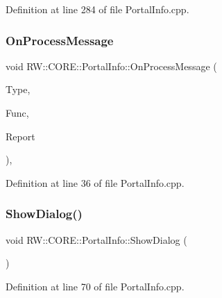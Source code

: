Definition at line 284 of file Portal\+Info.\+cpp.

\hypertarget{class_r_w_1_1_c_o_r_e_1_1_portal_info_aa564efcfe704d21d9504e57ea76f59b9}{}\label{class_r_w_1_1_c_o_r_e_1_1_portal_info_aa564efcfe704d21d9504e57ea76f59b9} 
\subsubsection{\texorpdfstring{On\+Process\+Message}{OnProcessMessage}}
{\footnotesize\ttfamily void R\+W\+::\+C\+O\+R\+E\+::\+Portal\+Info\+::\+On\+Process\+Message (\begin{DoxyParamCaption}\item[{Util\+::\+Message\+Receiver}]{Type,  }\item[{Util\+::\+Functions}]{Func,  }\item[{Q\+Byte\+Array}]{Report }\end{DoxyParamCaption})\hspace{0.3cm}{\ttfamily [virtual]}, {\ttfamily [slot]}}



Definition at line 36 of file Portal\+Info.\+cpp.

\hypertarget{class_r_w_1_1_c_o_r_e_1_1_portal_info_a8b87b8289b8d980540c3121e2e82b405}{}\label{class_r_w_1_1_c_o_r_e_1_1_portal_info_a8b87b8289b8d980540c3121e2e82b405} 
\subsubsection{\texorpdfstring{Show\+Dialog()}{ShowDialog()}}
{\footnotesize\ttfamily void R\+W\+::\+C\+O\+R\+E\+::\+Portal\+Info\+::\+Show\+Dialog (\begin{DoxyParamCaption}{ }\end{DoxyParamCaption})\hspace{0.3cm}{\ttfamily [private]}}



Definition at line 70 of file Portal\+Info.\+cpp.




